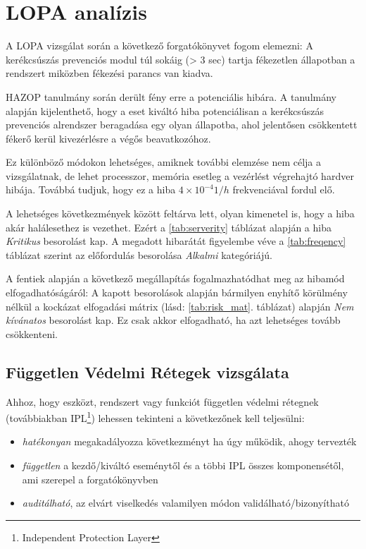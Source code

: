 \section{LOPA analízis}
A LOPA vizsgálat során a következő forgatókönyvet fogom elemezni: A kerékcsúszás prevenciós modul túl sokáig (> 3 sec) tartja fékezetlen állapotban a rendszert miközben fékezési parancs van kiadva.

HAZOP tanulmány során derült fény erre a potenciális hibára. 
A tanulmány alapján kijelenthető, hogy a eset kiváltó hiba potenciálisan a kerékcsúszás prevenciós alrendszer beragadása egy olyan állapotba, ahol jelentősen csökkentett fékerő kerül kivezérlésre a végős beavatkozóhoz.

Ez különböző módokon lehetséges, amiknek további elemzése nem célja a vizsgálatnak, de lehet processzor, memória esetleg a vezérlést végrehajtó hardver hibája.
Továbbá tudjuk, hogy ez a hiba $4\times10^{-4} {1/h}$ frekvenciával fordul elő.

A lehetséges következmények között feltárva lett, olyan kimenetel is, hogy a hiba akár halálesethez is vezethet.
Ezért a \ref{tab:serverity} táblázat alapján a hiba \emph{Kritikus} besorolást kap.
A megadott hibarátát figyelembe véve a \ref{tab:freqency} táblázat szerint az előfordulás besorolása \emph{Alkalmi} kategóriájú.

A fentiek alapján a következő megállapítás fogalmazhatódhat meg az hibamód elfogadhatóságáról: A kapott besorolások alapján bármilyen enyhítő körülmény nélkül a kockázat elfogadási mátrix (lásd: \ref{tab:risk_mat}. táblázat) alapján \emph{Nem kívánatos} besorolást kap.
Ez csak akkor elfogadható, ha azt lehetséges tovább csökkenteni.

\subsection{Független Védelmi Rétegek vizsgálata}
Ahhoz, hogy eszközt, rendszert vagy funkciót független védelmi rétegnek (továbbiakban IPL\footnote{Independent Protection Layer}) lehessen tekinteni a következőnek kell teljesülni\cite{LOPABOOK}:
\begin{itemize}
    \item \emph{hatékonyan} megakadályozza következményt ha úgy működik, ahogy tervezték
    \item \emph{független} a kezdő/kiváltó eseménytől és a többi IPL összes komponensétől, ami szerepel a forgatókönyvben
    \item \emph{auditálható}, az elvárt viselkedés valamilyen módon validálható/bizonyítható
\end{itemize}

